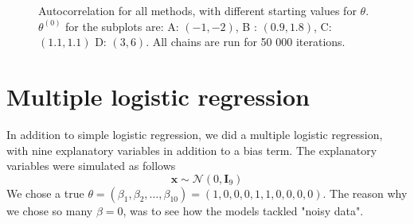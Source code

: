 \begin{figure}[ht]
    \caption{Autocorrelation for all methods, with different starting values for $\theta$. $\theta^{\left(0\right)}$ for the subplots are:   A: $(-1, -2)$, B : $(0.9, 1.8)$, C: $(1.1, 1.1)$ D: $(3, 6)$. All chains are run for 50 000 iterations.}%
    \label{fig:autocorrelation_dynamic}%
\end{figure}



\section{Multiple logistic regression}\label{sec:experiments_multiple_log_reg}
In addition to simple logistic regression, we did a multiple logistic regression, with nine explanatory variables in addition to a bias term. The explanatory variables  
were simulated as follows
\begin{equation*}
    \mathbf{x} \sim \mathcal{N}\left(0,\mathbf{I}_9\right)
\end{equation*}
We chose a true $\theta = \left(\beta_1, \beta_2, \ldots, \beta_{10}\right) = \left(1, 0, 0 , 0, 1, 1, 0, 0, 0, 0\right)$. The reason why we chose so many $\beta = 0$, was to see how the models tackled "noisy data". 

